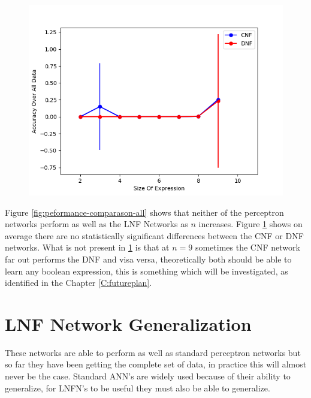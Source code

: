 \begin{figure}[H]
  \centering
  \begin{minipage}[b]{0.8\textwidth}
    \includegraphics[width=\textwidth]{CNFvsDNF.png}
    \caption{}
    \label{fig:peformance-comparason-cnfdnf}
  \end{minipage}
  \hfill
\end{figure}

Figure  \ref{fig:peformance-comparason-all} shows that neither of the perceptron networks perform as well as the LNF Networks as $n$ increases. Figure  \ref{fig:peformance-comparason-cnfdnf} shows on average there are no statistically significant differences between the CNF or DNF networks. What is not present in  \ref{fig:peformance-comparason-cnfdnf} is that at $n = 9$ sometimes the CNF network far out performs the DNF and visa versa, theoretically both should be able to learn any boolean expression, this is something which will be investigated, as identified in the Chapter \ref{C:futureplan}. 

\section{LNF Network Generalization}
These networks are able to perform as well as standard perceptron networks but so far they have been getting the complete set of data, in practice this will almost never be the case. Standard ANN's are widely used because of their ability to generalize, for LNFN's to be useful they must also be able to generalize.

